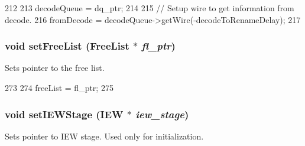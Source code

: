 \begin{DoxyCode}
212 {
213     decodeQueue = dq_ptr;
214 
215     // Setup wire to get information from decode.
216     fromDecode = decodeQueue->getWire(-decodeToRenameDelay);
217 }
\end{DoxyCode}
\hypertarget{classDefaultRename_a2d3550e87cb180105600dfaefcf83358}{
\subsubsection[{setFreeList}]{\setlength{\rightskip}{0pt plus 5cm}void setFreeList ({\bf FreeList} $\ast$ {\em fl\_\-ptr})}}
\label{classDefaultRename_a2d3550e87cb180105600dfaefcf83358}
Sets pointer to the free list. 


\begin{DoxyCode}
273 {
274     freeList = fl_ptr;
275 }
\end{DoxyCode}
\hypertarget{classDefaultRename_a4b6d8e4b2cf6249763ed2fc73eb1af47}{
\subsubsection[{setIEWStage}]{\setlength{\rightskip}{0pt plus 5cm}void setIEWStage ({\bf IEW} $\ast$ {\em iew\_\-stage})}}
\label{classDefaultRename_a4b6d8e4b2cf6249763ed2fc73eb1af47}
Sets pointer to IEW stage. Used only for initialization. 



